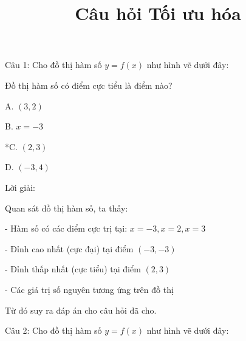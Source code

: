 \documentclass[a4paper,12pt]{article}
\begin{document}
\title{Câu hỏi Tối ưu hóa}
\maketitle

Câu 1: Cho đồ thị hàm số \(y=f(x)\) như hình vẽ dưới đây:




Đồ thị hàm số có điểm cực tiểu là điểm nào?

A. \((3,2)\)

B. \(x=-3\)

*C. \((2,3)\)

D. \((-3,4)\)

Lời giải:


            Quan sát đồ thị hàm số, ta thấy:

- Hàm số có các điểm cực trị tại: \(x = -3, x = 2, x = 3\)

- Đỉnh cao nhất (cực đại) tại điểm \((-3, -3)\)

- Đỉnh thấp nhất (cực tiểu) tại điểm \((2, 3)\)

- Các giá trị số nguyên tương ứng trên đồ thị

Từ đó suy ra đáp án cho câu hỏi đã cho.




Câu 2: Cho đồ thị hàm số \(y=f(x)\) như hình vẽ dưới đây:
\end{document}
